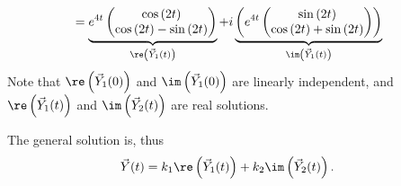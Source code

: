 \documentclass[10pt]{mypackage}
\begin{document}
\begin{example}
\begin{align*}
                            &= \underbrace{e^{4t} \begin{pmatrix}\cos\left(2t\right) \\ \cos\left(2t\right) - \sin\left(2t\right)\end{pmatrix}}_{\re\left(\vec{Y}_{1}(t)\right)} + i\underbrace{\left(e^{4t} \begin{pmatrix}\sin\left(2t\right)\\ \cos\left(2t\right) + \sin\left(2t\right)\end{pmatrix}\right)}_{\im\left(\vec{Y}_1(t)\right)}
  \end{align*}
  Note that $\re\left(\vec{Y}_1(0)\right)$ and $\im\left(\vec{Y}_1(0)\right)$ are linearly independent, and $\re\left(\vec{Y}_1(t)\right)$ and $\im\left(\vec{Y}_2(t)\right)$ are real solutions.\newline

  The general solution is, thus
  \begin{align*}
    \vec{Y}(t) &= k_1\re\left(\vec{Y}_1(t)\right) + k_2\im\left(\vec{Y}_2(t)\right).
  \end{align*}

\end{example}
\end{document}
